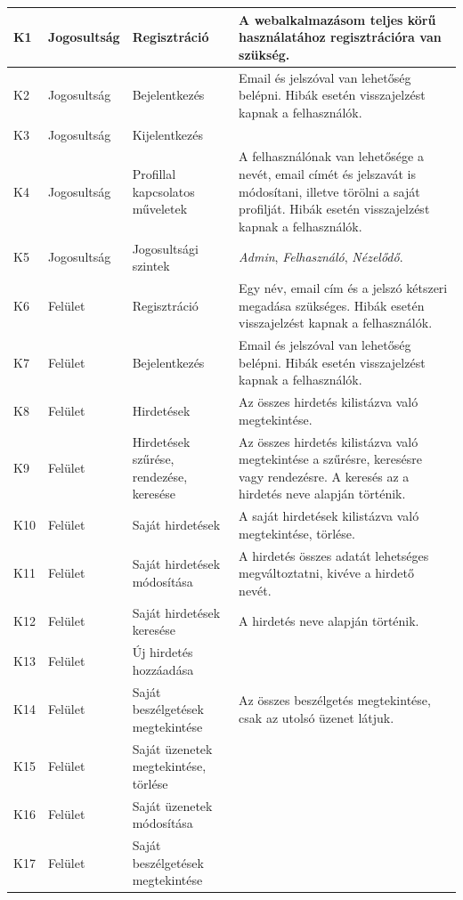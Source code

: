 \documentclass[]{thesis-ekf}
\theoremstyle{definition}
\theoremstyle{remark}
\begin{document}
\begin{longtable}{|l|l|p{3cm}|p{8cm}|}
				K1 & Jogosultság & Regisztráció & A webalkalmazásom teljes körű használatához regisztrációra van szükség. \\ \hline
				K2 & Jogosultság & Bejelentkezés & Email és jelszóval van lehetőség belépni. Hibák esetén visszajelzést kapnak a felhasználók. \\ \hline
				K3 & Jogosultság & Kijelentkezés & \\ \hline
				K4 & Jogosultság & Profillal kapcsolatos műveletek & A felhasználónak van lehetősége a nevét, email címét és jelszavát is módosítani, illetve törölni a saját profilját. Hibák esetén visszajelzést kapnak a felhasználók. \\ \hline
				K5 & Jogosultság & Jogosultsági szintek & \emph{Admin}, \emph{Felhasználó}, \emph{Nézelődő}. \\ \hline
				K6 & Felület & Regisztráció & Egy név, email cím és a jelszó kétszeri megadása szükséges. Hibák esetén visszajelzést kapnak a felhasználók. \\ \hline
				K7 & Felület & Bejelentkezés & Email és jelszóval van lehetőség belépni. Hibák esetén visszajelzést kapnak a felhasználók. \\ \hline
				K8 & Felület & Hirdetések & Az összes hirdetés kilistázva való megtekintése. \\ \hline
				K9 & Felület & Hirdetések szűrése, rendezése, keresése & Az összes hirdetés kilistázva való megtekintése a szűrésre, keresésre vagy rendezésre. A keresés az a hirdetés neve alapján történik. \\ \hline
				K10 & Felület & Saját hirdetések & A saját hirdetések kilistázva való megtekintése, törlése. \\ \hline
				K11 & Felület & Saját hirdetések módosítása & A hirdetés összes adatát lehetséges megváltoztatni, kivéve a hirdető nevét. \\ \hline
				K12 & Felület & Saját hirdetések keresése & A hirdetés neve alapján történik. \\ \hline
				K13 & Felület & Új hirdetés hozzáadása & ~ \\ \hline
				K14 & Felület & Saját beszélgetések megtekintése & Az összes beszélgetés megtekintése, csak az utolsó üzenet látjuk. \\ \hline
				K15 & Felület & Saját üzenetek megtekintése, törlése & ~ \\ \hline
				K16 & Felület & Saját üzenetek módosítása & ~ \\ \hline
				K17 & Felület & Saját beszélgetések megtekintése & ~ \\ \hline

\end{longtable}
\end{document}
